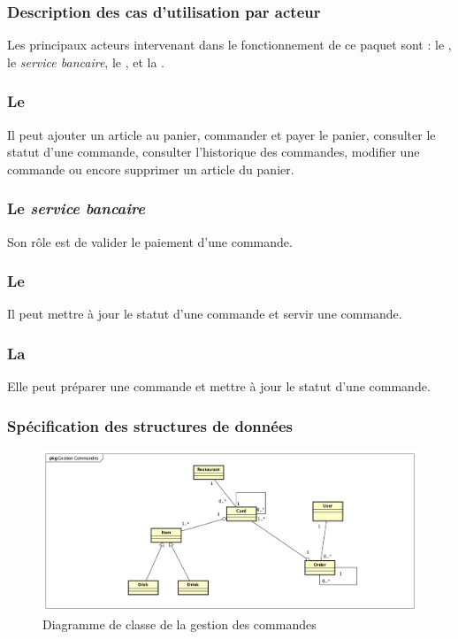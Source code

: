 \subsubsection{Description des cas d'utilisation par acteur}
Les principaux acteurs intervenant dans le fonctionnement de ce paquet sont : le \cl, le \emph{service bancaire}, le \sev, et la \csn.
\subsubsection*{Le \cl}
Il peut ajouter un article au panier, commander et payer le panier, consulter le statut d'une commande, consulter l'historique des commandes, modifier une commande ou encore supprimer un article du panier.

\subsubsection*{Le \emph{service bancaire}}
Son rôle est de valider le paiement d'une commande.

\subsubsection*{Le \sev}
Il peut mettre à jour le statut d'une commande et servir une commande.

\subsubsection*{La \csn}
Elle peut préparer une commande et mettre à jour le statut d'une commande.

\subsubsection{Spécification des structures de données}
\begin{figure}[H]
	\centering
	\includegraphics[scale=0.4]{assets/images/gestion_command_cd.png}
	\caption{Diagramme de classe de la gestion des commandes}
	\label{fig.15}
\end{figure}

